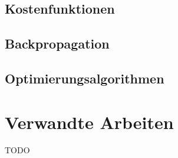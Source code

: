\subsection{Kostenfunktionen}
\subsection{Backpropagation}\label{subsection:backpropagation}
\subsection{Optimierungsalgorithmen}
\section{Verwandte Arbeiten}
TODO